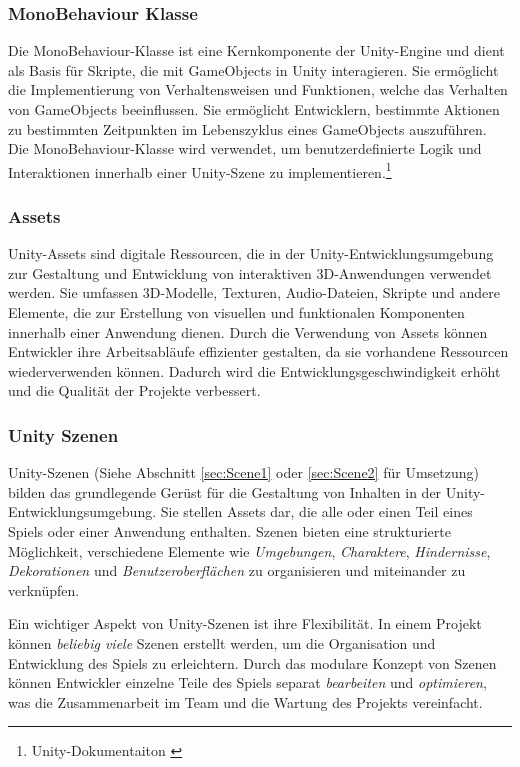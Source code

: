 
\subsubsection*{MonoBehaviour Klasse}
Die MonoBehaviour-Klasse ist eine Kernkomponente der Unity-Engine und dient als Basis für Skripte, die mit GameObjects
in Unity interagieren. Sie ermöglicht die Implementierung von Verhaltensweisen und Funktionen, welche das Verhalten von
GameObjects beeinflussen. Sie ermöglicht Entwicklern, bestimmte Aktionen zu bestimmten Zeitpunkten im Lebenszyklus eines GameObjects auszuführen.
Die MonoBehaviour-Klasse wird verwendet, um benutzerdefinierte Logik und Interaktionen innerhalb einer
Unity-Szene zu implementieren.\footnote{Unity-Dokumentaiton \cite{MonoBevaiour Class}}

\subsubsection{Assets}\label{sec:UnityAssets}
Unity-Assets sind digitale Ressourcen, die in der Unity-Entwicklungsumgebung zur Gestaltung und Entwicklung von interaktiven
3D-Anwendungen verwendet werden. Sie umfassen 3D-Modelle, Texturen, Audio-Dateien, Skripte und andere Elemente, die zur
Erstellung von visuellen und funktionalen Komponenten innerhalb einer Anwendung dienen. Durch die Verwendung von Assets
können Entwickler ihre Arbeitsabläufe effizienter gestalten, da sie vorhandene Ressourcen wiederverwenden können. Dadurch
wird die Entwicklungsgeschwindigkeit erhöht und die Qualität der Projekte verbessert.

\subsubsection{Unity Szenen}\label{sec:UnityScenes}
Unity-Szenen (Siehe Abschnitt \ref{sec:Scene1} oder \ref{sec:Scene2} für Umsetzung) bilden das grundlegende Gerüst für
die Gestaltung von Inhalten in der Unity-Entwicklungsumgebung. Sie stellen
Assets dar, die alle oder einen Teil eines Spiels oder einer Anwendung enthalten. Szenen bieten eine strukturierte Möglichkeit,
verschiedene Elemente wie \textit{Umgebungen}, \textit{Charaktere}, \textit{Hindernisse}, \textit{Dekorationen} und
\textit{Benutzeroberflächen} zu organisieren und miteinander zu verknüpfen.

Ein wichtiger Aspekt von Unity-Szenen ist ihre Flexibilität. In einem Projekt können \textit{beliebig viele} Szenen erstellt werden,
um die Organisation und Entwicklung des Spiels zu erleichtern. Durch das modulare Konzept von Szenen können Entwickler
einzelne Teile des Spiels separat \textit{bearbeiten} und \textit{optimieren}, was die Zusammenarbeit im Team und die
Wartung des Projekts vereinfacht.

